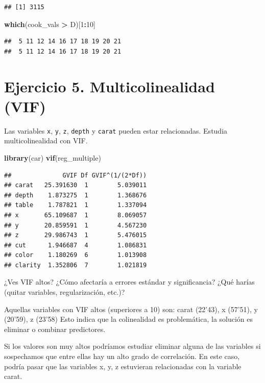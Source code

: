 \documentclass[
  spanish,
]{article}
\newenvironment{Shaded}{\begin{snugshade}}{\end{snugshade}}
\newcommand{\DecValTok}[1]{\textcolor[rgb]{0.00,0.00,0.81}{#1}}
\newcommand{\FunctionTok}[1]{\textcolor[rgb]{0.13,0.29,0.53}{\textbf{#1}}}
\newcommand{\NormalTok}[1]{#1}
\newcommand{\SpecialCharTok}[1]{\textcolor[rgb]{0.81,0.36,0.00}{\textbf{#1}}}
\begin{document}
\begin{verbatim}
## [1] 3115
\end{verbatim}

\begin{Shaded}
\begin{Highlighting}[]
\FunctionTok{which}\NormalTok{(cook\_vals }\SpecialCharTok{\textgreater{}}\NormalTok{ D)[}\DecValTok{1}\SpecialCharTok{:}\DecValTok{10}\NormalTok{]}
\end{Highlighting}
\end{Shaded}

\begin{verbatim}
##  5 11 12 14 16 17 18 19 20 21 
##  5 11 12 14 16 17 18 19 20 21
\end{verbatim}

\section*{Ejercicio 5. Multicolinealidad
(VIF)}\label{ejercicio-5.-multicolinealidad-vif}

Las variables \texttt{x}, \texttt{y}, \texttt{z}, \texttt{depth} y
\texttt{carat} pueden estar relacionadas. Estudia multicolinealidad con
VIF.

\begin{Shaded}
\begin{Highlighting}[]
\FunctionTok{library}\NormalTok{(car)}
\FunctionTok{vif}\NormalTok{(reg\_multiple)}
\end{Highlighting}
\end{Shaded}

\begin{verbatim}
##              GVIF Df GVIF^(1/(2*Df))
## carat   25.391630  1        5.039011
## depth    1.873275  1        1.368676
## table    1.787821  1        1.337094
## x       65.109687  1        8.069057
## y       20.859591  1        4.567230
## z       29.986743  1        5.476015
## cut      1.946687  4        1.086831
## color    1.180269  6        1.013908
## clarity  1.352806  7        1.021819
\end{verbatim}

¿Ves VIF altos? ¿Cómo afectaría a errores estándar y significancia? ¿Qué
harías (quitar variables, regularización, etc.)?

Aquellas variables con VIF altos (superiores a 10) son: carat (22'43), x
(57'51), y (20'59), z (23'58) Esto indica que la colinealidad es
problemática, la solución es eliminar o combinar predictores.

Si los valores son muy altos podríamos estudiar eliminar alguna de las
variables si sospechamos que entre ellas hay un alto grado de
correlación. En este caso, podría pasar que las variables x, y, z
estuvieran relacionadas con la variable carat.
\end{document}
